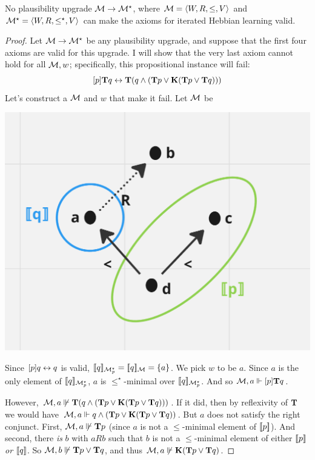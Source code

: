 \documentclass[letterpaper]{article}
\begin{document}
\begin{proposition}
    No plausibility upgrade $\mathcal{M} \to \mathcal{M}^\star$,  where $\mathcal{M} = \langle W, R, \leq, V \rangle$ and $\mathcal{M}^\star = \langle W, R, \leq^\star, V \rangle$ can make the axioms for iterated Hebbian learning valid.
\end{proposition}
\begin{proof}
    Let $\mathcal{M} \to \mathcal{M}^\star$ be any plausibility upgrade, and suppose that the first four axioms are valid for this upgrade.  I will show that the very last axiom cannot hold for all $\mathcal{M}, w$; specifically, this propositional instance will fail:
    \[
        [p] \textrm{\textup{\textbf{T}}} q \leftrightarrow 
        \textrm{\textup{\textbf{T}}} (q \land (\textrm{\textup{\textbf{T}}} p \lor \textrm{\textup{\textbf{K}}} (\textrm{\textup{\textbf{T}}} p \lor \textrm{\textup{\textbf{T}}} q)))
    \]
    Let's construct a $\mathcal{M}$ and $w$ that make it fail.  Let $\mathcal{M}$ be

    \begin{center}
    \includegraphics[scale=0.2]{4-22-24-mockup.png}
    \end{center}

    Since $[p] q \leftrightarrow q$ is valid, $[\![\mbox{\em $ q $\/}]\!]_{\mathcal{M}^\star_p} = [\![\mbox{\em $ q $\/}]\!]_{\mathcal{M}} = \{ a \}$.  We pick $w$ to be $a$. Since $a$ is the only element of $[\![\mbox{\em $ q $\/}]\!]_{\mathcal{M}^\star_p}$, $a$ is $\leq^\star$-minimal over $[\![\mbox{\em $ q $\/}]\!]_{\mathcal{M}^\star_p}$.  And so $\mathcal{M}, a \Vdash [p] \textrm{\textup{\textbf{T}}} q$.
    
    However, $\mathcal{M}, a \not \Vdash \textrm{\textup{\textbf{T}}} (q \land (\textrm{\textup{\textbf{T}}} p \lor \textrm{\textup{\textbf{K}}} (\textrm{\textup{\textbf{T}}} p \lor \textrm{\textup{\textbf{T}}} q)))$.  If it did, then by reflexivity of $\Typ$ we would have $\mathcal{M}, a \Vdash q \land (\textrm{\textup{\textbf{T}}} p \lor \textrm{\textup{\textbf{K}}} (\textrm{\textup{\textbf{T}}} p \lor \textrm{\textup{\textbf{T}}} q))$.  But $a$ does not satisfy the right conjunct.  First, $\mathcal{M}, a \not \Vdash \textrm{\textup{\textbf{T}}} p$ (since $a$ is not a $\leq$-minimal element of $[\![\mbox{\em $ p $\/}]\!]$).  And second, there \emph{is} $b$ with $a{R}b$ such that $b$ is not a $\leq$-minimal element of either $[\![\mbox{\em $ p $\/}]\!]$ \emph{or} $[\![\mbox{\em $ q $\/}]\!]$.  So $\mathcal{M}, b \not \Vdash \textrm{\textup{\textbf{T}}} p \lor \textrm{\textup{\textbf{T}}} q$, and thus $\mathcal{M}, a \not \Vdash \textrm{\textup{\textbf{K}}} (\textrm{\textup{\textbf{T}}} p \lor \textrm{\textup{\textbf{T}}} q)$. \qedhere
\end{proof}
\end{document}
